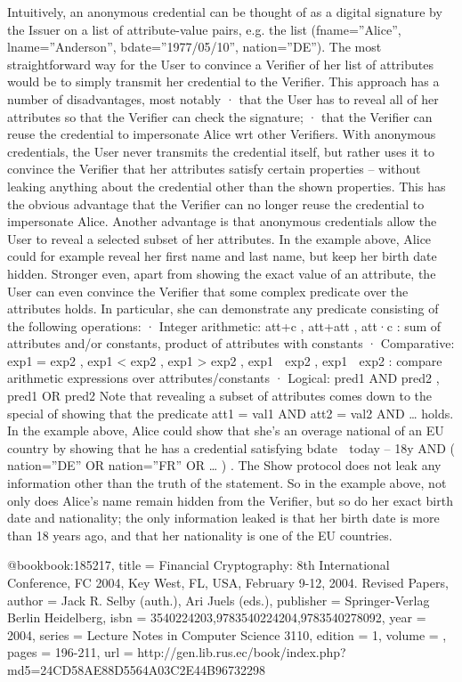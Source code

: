 Intuitively, an anonymous credential can be thought of as a digital signature by the Issuer on a list of
attribute-value pairs, e.g. the list
(fname=”Alice”, lname=”Anderson”, bdate=”1977/05/10”, nation=”DE”).
The most straightforward way for the User to convince a Verifier of her list of attributes would be to
simply transmit her credential to the Verifier. This approach has a number of disadvantages, most
notably
· that the User has to reveal all of her attributes so that the Verifier can check the signature;
· that the Verifier can reuse the credential to impersonate Alice wrt other Verifiers.
With anonymous credentials, the User never transmits the credential itself, but rather uses it to convince
the Verifier that her attributes satisfy certain properties – without leaking anything about the credential
other than the shown properties. This has the obvious advantage that the Verifier can no longer reuse the
credential to impersonate Alice. Another advantage is that anonymous credentials allow the User to
reveal a selected subset of her attributes. In the example above, Alice could for example reveal her first
name and last name, but keep her birth date hidden.
Stronger even, apart from showing the exact value of an attribute, the User can even convince the
Verifier that some complex predicate over the attributes holds. In particular, she can demonstrate any
predicate consisting of the following operations:
· Integer arithmetic: att+c , att+att , att·c : sum of attributes and/or constants, product of
attributes with constants
· Comparative: exp1 = exp2 , exp1 < exp2 , exp1 > exp2 , exp1  exp2 , exp1  exp2 : compare
arithmetic expressions over attributes/constants
· Logical: pred1 AND pred2 , pred1 OR pred2
Note that revealing a subset of attributes comes down to the special of showing that the predicate
att1 = val1 AND att2 = val2 AND …
holds. In the example above, Alice could show that she’s an overage national of an EU country by
showing that he has a credential satisfying
bdate  today – 18y AND ( nation=”DE” OR nation=”FR” OR … ) .
The Show protocol does not leak any information other than the truth of the statement. So in the
example above, not only does Alice’s name remain hidden from the Verifier, but so do her exact birth
date and nationality; the only information leaked is that her birth date is more than 18 years ago, and that
her nationality is one of the EU countries.


@book{book:185217,
	title =     {Financial Cryptography: 8th International Conference, FC 2004, Key West, FL, USA, February 9-12, 2004. Revised Papers},
	author =    {Jack R. Selby (auth.), Ari Juels (eds.)},
	publisher = {Springer-Verlag Berlin Heidelberg},
	isbn =      {3540224203,9783540224204,9783540278092},
	year =      {2004},
	series =    {Lecture Notes in Computer Science 3110},
	edition =   {1},
	volume =    {},
	pages = {196-211},
	url =       {http://gen.lib.rus.ec/book/index.php?md5=24CD58AE88D5564A03C2E44B96732298}}


